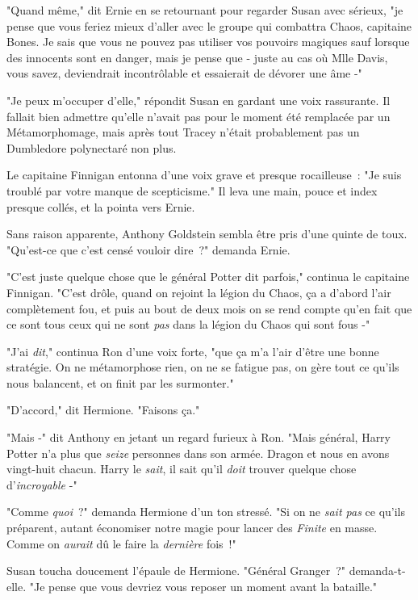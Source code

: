 "Quand même," dit Ernie en se retournant pour regarder Susan avec sérieux, "je pense que vous feriez mieux d'aller avec le groupe qui combattra Chaos, capitaine Bones. Je sais que vous ne pouvez pas utiliser vos pouvoirs magiques sauf lorsque des innocents sont en danger, mais je pense que - juste au cas où Mlle Davis, vous savez, deviendrait incontrôlable et essaierait de dévorer une âme -"

"Je peux m'occuper d'elle," répondit Susan en gardant une voix rassurante. Il fallait bien admettre qu'elle n'avait pas pour le moment été remplacée par un Métamorphomage, mais après tout Tracey n'était probablement pas un Dumbledore polynectaré non plus.

Le capitaine Finnigan entonna d'une voix grave et presque rocailleuse~: "Je suis troublé par votre manque de scepticisme." Il leva une main, pouce et index presque collés, et la pointa vers Ernie.

Sans raison apparente, Anthony Goldstein sembla être pris d'une quinte de toux. "Qu'est-ce que c'est censé vouloir dire~?" demanda Ernie.

"C'est juste quelque chose que le général Potter dit parfois," continua le capitaine Finnigan. "C'est drôle, quand on rejoint la légion du Chaos, ça a d'abord l'air complètement fou, et puis au bout de deux mois on se rend compte qu'en fait que ce sont tous ceux qui ne sont \emph{pas} dans la légion du Chaos qui sont fous -"

"J'ai \emph{dit}," continua Ron d'une voix forte, "que ça m'a l'air d'être une bonne stratégie. On ne métamorphose rien, on ne se fatigue pas, on gère tout ce qu'ils nous balancent, et on finit par les surmonter."

"D'accord," dit Hermione. "Faisons ça."

"Mais -" dit Anthony en jetant un regard furieux à Ron. "Mais général, Harry Potter n'a plus que \emph{seize} personnes dans son armée. Dragon et nous en avons vingt-huit chacun. Harry le \emph{sait}, il sait qu'il \emph{doit} trouver quelque chose d'\emph{incroyable} -"

"Comme \emph{quoi}~?" demanda Hermione d'un ton stressé. "Si on ne \emph{sait pas} ce qu'ils préparent, autant économiser notre magie pour lancer des \emph{Finite} en masse. Comme on \emph{aurait} dû le faire la \emph{dernière} fois~!"

Susan toucha doucement l'épaule de Hermione. "Général Granger~?" demanda-t-elle. "Je pense que vous devriez vous reposer un moment avant la bataille."

